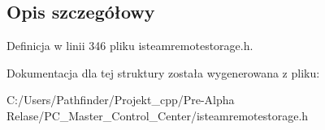 \subsection{Opis szczegółowy}


Definicja w linii 346 pliku isteamremotestorage.\+h.



Dokumentacja dla tej struktury została wygenerowana z pliku\+:\begin{DoxyCompactItemize}
\item 
C\+:/\+Users/\+Pathfinder/\+Projekt\+\_\+cpp/\+Pre-\/\+Alpha Relase/\+P\+C\+\_\+\+Master\+\_\+\+Control\+\_\+\+Center/isteamremotestorage.\+h\end{DoxyCompactItemize}
